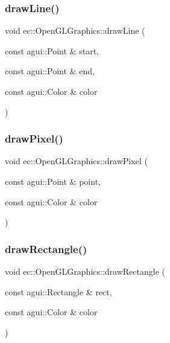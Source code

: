 \subsubsection{\texorpdfstring{draw\+Line()}{drawLine()}}
{\footnotesize\ttfamily void ec\+::\+Open\+G\+L\+Graphics\+::draw\+Line (\begin{DoxyParamCaption}\item[{const agui\+::\+Point \&}]{start,  }\item[{const agui\+::\+Point \&}]{end,  }\item[{const agui\+::\+Color \&}]{color }\end{DoxyParamCaption})\hspace{0.3cm}{\ttfamily [override]}}

\mbox{\label{classec_1_1_open_g_l_graphics_a3f747db5664a109b28c66de6e092fbcf}} 
\subsubsection{\texorpdfstring{draw\+Pixel()}{drawPixel()}}
{\footnotesize\ttfamily void ec\+::\+Open\+G\+L\+Graphics\+::draw\+Pixel (\begin{DoxyParamCaption}\item[{const agui\+::\+Point \&}]{point,  }\item[{const agui\+::\+Color \&}]{color }\end{DoxyParamCaption})\hspace{0.3cm}{\ttfamily [override]}}

\mbox{\label{classec_1_1_open_g_l_graphics_a9aca169aa522b2daca935407d865c84f}} 
\subsubsection{\texorpdfstring{draw\+Rectangle()}{drawRectangle()}}
{\footnotesize\ttfamily void ec\+::\+Open\+G\+L\+Graphics\+::draw\+Rectangle (\begin{DoxyParamCaption}\item[{const agui\+::\+Rectangle \&}]{rect,  }\item[{const agui\+::\+Color \&}]{color }\end{DoxyParamCaption})\hspace{0.3cm}{\ttfamily [override]}}

